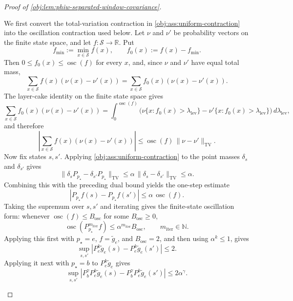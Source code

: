 \documentclass[11pt]{article}
\begin{document}
\begin{proof}[Proof of \cref{obj:lem:phiw-separated-window-covariance}]
\begin{enumerate}
We first convert the total-variation contraction in \cref{obj:ass:uniform-contraction} into the oscillation contraction used below. Let \(\nu\) and \(\nu'\) be probability vectors on the finite state space, and let \(f:\mathcal S\to\mathbb R\). Put
\[
f_{\min}:=\min_{x\in\mathcal S} f(x),
\qquad
f_0(x):=f(x)-f_{\min}.
\]
Then \(0\le f_0(x)\le \operatorname{osc}(f)\) for every \(x\), and, since \(\nu\) and \(\nu'\) have equal total mass,
\[
\sum_{x\in\mathcal S} f(x)(\nu(x)-\nu'(x))
=
\sum_{x\in\mathcal S} f_0(x)(\nu(x)-\nu'(x)).
\]
The layer-cake identity on the finite state space gives
\[
\sum_{x\in\mathcal S} f_0(x)(\nu(x)-\nu'(x))
=
\int_{0}^{\operatorname{osc}(f)}
\bigl(\nu\{x:f_0(x)>\lambda_{\mathrm{lev}}\}
      -\nu'\{x:f_0(x)>\lambda_{\mathrm{lev}}\}\bigr)
\,d\lambda_{\mathrm{lev}},
\]
and therefore
\[
\left|
\sum_{x\in\mathcal S} f(x)(\nu(x)-\nu'(x))
\right|
\le
\operatorname{osc}(f)\,\|\nu-\nu'\|_{\mathrm{TV}}.
\]
Now fix states \(s,s'\). Applying \cref{obj:ass:uniform-contraction} to the point masses \(\delta_s\) and \(\delta_{s'}\) gives
\[
\|\delta_s P_{p_\star}-\delta_{s'}P_{p_\star}\|_{\mathrm{TV}}
\le
\alpha\,\|\delta_s-\delta_{s'}\|_{\mathrm{TV}}
\le \alpha .
\]
Combining this with the preceding dual bound yields the one-step estimate
\[
|P_{p_\star}f(s)-P_{p_\star}f(s')|
\le
\alpha\,\operatorname{osc}(f).
\]
Taking the supremum over \(s,s'\) and iterating gives the finite-state oscillation form: whenever \(\operatorname{osc}(f)\le B_{\mathrm{osc}}\) for some \(B_{\mathrm{osc}}\ge0\),
\[
\operatorname{osc}(P_{p_\star}^{m_{\mathrm{iter}}}f)
\le
\alpha^{m_{\mathrm{iter}}}B_{\mathrm{osc}},
\qquad m_{\mathrm{iter}}\in\mathbb N.
\]
Applying this first with \(p_\star=e\), \(f=\widetilde g_e\), and \(B_{\mathrm{osc}}=2\), and then using \(\alpha^k\le1\), gives
\[
\sup_{s,s'}|P_e^k\widetilde g_e(s)-P_e^k\widetilde g_e(s')|\le 2.
\]
Applying it next with \(p_\star=b\) to \(P_e^k\widetilde g_e\) gives
\[
\sup_{s,s'}
\left|
P_b^\gamma P_e^k\widetilde g_e(s)
-
P_b^\gamma P_e^k\widetilde g_e(s')
\right|
\le
2\alpha^\gamma .
\] %


\end{enumerate}
\end{proof}
\end{document}
